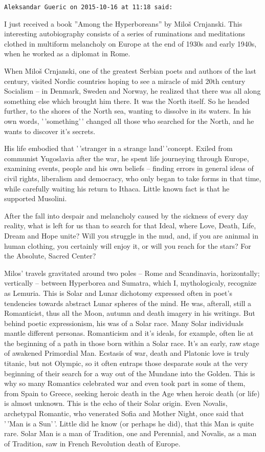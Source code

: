 \begin{footnotesize}
\begin{sffamily}
\texttt{Aleksandar Gueric on 2015-10-16 at 11:18 said:}

I just received a book ''Among the Hyperboreans'' by Miloš Crnjanski. This interesting autobiography consists of a series of ruminations and meditations clothed in multiform melancholy on Europe at the end of 1930s and early 1940s, when he worked as a diplomat in Rome.

When Miloš Crnjanski, one of the greatest Serbian poets and authors of the last century, visited Nordic countries hoping to see a miracle of mid 20th century Socialism -- in Denmark, Sweden and Norway, he realized that there was all along something else which brought him there. It was the North itself. So he headed further, to the shores of the North sea, wanting to dissolve in its waters. In his own words, '\,'something'\,' changed all those who searched for the North, and he wants to discover it's secrets.

His life embodied that '\,'stranger in a strange land'\,'concept. Exiled from communist Yugoslavia after the war, he spent life journeying through Europe, examining events, people and his own beliefs -- finding errors in general ideas of civil rights, liberalism and democracy, who only began to take forms in that time, while carefully waiting his return to Ithaca. Little known fact is that he supported Musolini.

After the fall into despair and melancholy caused by the sickness of every day reality, what is left for us than to search for that Ideal, where Love, Death, Life, Dream and Hope unite? Will you struggle in the mud, and, if you are aninmal in human clothing, you certainly will enjoy it, or will you reach for the stars? For the Absolute, Sacred Center?

Milos' travels gravitated around two poles -- Rome and Scandinavia, horizontally; vertically -- between Hyperborea and Sumatra, which I, mythologicaly, recognize as Lemuria. This is Solar and Lunar dichotomy expressed often in poet's tendencies towards abstract Lunar spheres of the mind. He was, afterall, still a Romanticist, thus all the Moon, autumn and death imagery in his writings. But behind poetic expressionism, his was of a Solar race. Many Solar individuals mantle different personas. Romanticism and it's ideals, for example, often lie at the beginning of a path in those born within a Solar race. It's an early, raw stage of awakened Primordial Man. Ecstasis of war, death and Platonic love is truly titanic, but not Olympic, so it often entraps those desparate souls at the very beginning of their search for a way out of the Mundane into the Golden. This is why so many Romantics celebrated war and even took part in some of them, from Spain to Greece, seeking heroic death in the Age when heroic death (or life) is almost unknown. This is the echo of their Solar origin. Even Novalis, archetypal Romantic, who venerated Sofia and Mother Night, once said that '\,'Man is a Sun'\,'. Little did he know (or perhaps he did), that this Man is quite rare. Solar Man is a man of Tradition, one and Perennial, and Novalis, as a man of Tradition, saw in French Revolution death of Europe.


\end{sffamily}
\end{footnotesize}
